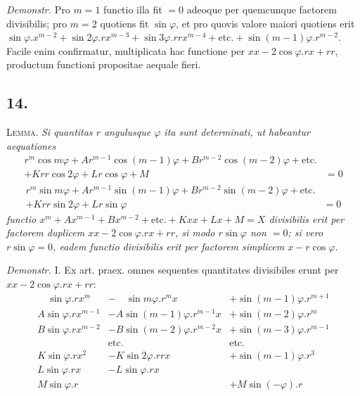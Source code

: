 \documentclass[twoside,12pt, showframe]{memoir}
\begin{document}
\textit{Demonstr.} Pro \(m = 1\) functio illa fit \(= 0\) adeoque per quemcunque factorem divisibilis; pro \(m=2\) quotiens fit \(\sin \varphi\), et pro quovis valore maiori quotiens erit \( \sin \varphi.x^{m-2} + \sin 2\varphi . rx^{m-3} + \sin 3\varphi . rrx^{m-4} + \text{etc{.}}+\sin(m-1)\varphi . r^{m-2} \). Facile enim confirmatur, multiplicata hac functione per \(xx-2\cos\varphi.rx + rr\), productum functioni propositae aequale fieri.

\subsection*{14.}

\textsc{Lemma.} \textit{Si quantitas \(r\) angulusque \(\varphi\) ita sunt determinati, ut habeantur aequationes}
\begin{align*} r^m \cos m \varphi + A r^{m-1} \cos(m-1) \varphi + B r^{m-2}\cos(m-2) \varphi + \text{etc{.}} &\\
+ Krr \cos 2\varphi + Lr \cos \varphi + M &= 0  \tag*{[1]} \end{align*}
\begin{align*} r^m \sin m \varphi + A r^{m-1} \sin(m-1) \varphi + B r^{m-2}\sin(m-2) \varphi + \text{etc{.}}& \\
+ Krr \sin 2\varphi + Lr \sin \varphi & = 0  \tag*{[2]}\end{align*}
\textit{functio \(x^m+Ax^{m-1} + Bx^{m-2}+\text{etc{.}}+Kxx + Lx + M = X\) divisibilis erit per factorem duplicem \(xx-2\cos\varphi.rx+rr\), si modo \(r\sin\varphi\) non \(=0\); si vero \(r\sin\varphi = 0\), eadem functio divisibilis erit per factorem simplicem \(x - r \cos\varphi\).}

\textit{Demonstr.} I. Ex art. praex. omnes sequentes quantitates divisibiles erunt per \(xx - 2\cos \varphi . rx + rr\):\[\begin{array}{lll} \hspace{1em} \sin \varphi. rx^m &-\hspace{1em} \sin m \varphi . r^m x &+ \sin (m-1) \varphi . r^{m+1} \\ A\sin \varphi. rx^{m-1} &- A\sin (m-1) \varphi . r^{m-1} x &+ \sin (m-2) \varphi . r^{m} \\ B\sin \varphi. rx^{m-2} &- B \sin (m-2) \varphi . r^{m-2} x &+ \sin (m-3) \varphi . r^{m-1} \\ &\text{etc{.}} & \text{etc{.}} \\ K\sin \varphi. rx^2 &- K\sin 2 \varphi . rr x &+ \sin (m-1) \varphi . r^{3} \\ L\sin \varphi. rx &- L \sin  \varphi . r x &  \\ M\sin \varphi. r &  &+ M\sin(-\varphi).r \end{array}\]
\end{document}
